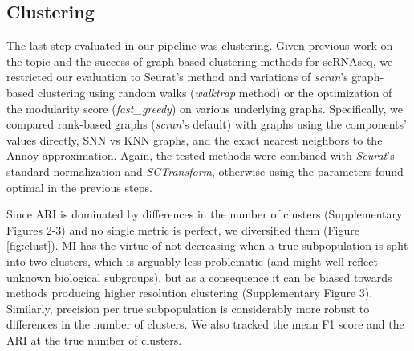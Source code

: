 \documentclass{bmcart}
\begin{document}
\subsection*{Clustering}

The last step evaluated in our pipeline was clustering. Given previous work on the topic \cite{duoClustering2018,freytagComparison2018} and the success of graph-based clustering methods for scRNAseq, we restricted our evaluation to Seurat's method and variations of \textit{scran}'s graph-based clustering using random walks (\textit{walktrap} method) or the optimization of the modularity score (\textit{fast\_greedy}) on various underlying graphs. Specifically, we compared rank-based graphs (\textit{scran}'s default) with graphs using the components' values directly, SNN vs KNN graphs, and the exact nearest neighbors to the Annoy approximation. Again, the tested methods were combined with \textit{Seurat}'s standard normalization and \textit{SCTransform}, otherwise using the parameters found optimal in the previous steps. 

Since ARI is dominated by differences in the number of clusters (Supplementary Figures 2-3) and no single metric is perfect, we diversified them (Figure \ref{fig:clust}). MI has the virtue of not decreasing when a true subpopulation is split into two clusters, which is arguably less problematic (and might well reflect unknown biological subgroups), but as a consequence it can be biased towards methods producing higher resolution clustering (Supplementary Figure 3). Similarly, precision per true subpopulation is considerably more robust to differences in the number of clusters. We also tracked the mean F1 score and the ARI at the true number of clusters. 
\end{document}

